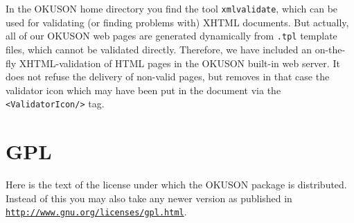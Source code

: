 \documentclass[12pt,openany,a4paper]{book}
\newcommand{\OKUSON}{\textsf{OKUSON}}
\begin{document}
In the {\OKUSON} home directory you find the tool \texttt{xmlvalidate},
which can be used for validating (or finding problems with) XHTML documents.
But actually, all of our {\OKUSON} web pages are generated dynamically from
\texttt{.tpl} template  files, which cannot be validated directly.  Therefore,
we have included an on-the-fly XHTML-validation of HTML pages in the
{\OKUSON} built-in web server. It does not refuse the delivery of non-valid
pages, but removes in that case the validator icon which may have been 
put in the document via the \texttt{<ValidatorIcon/>} tag.

\chapter{GPL}\label{ch:GPL}

Here is the text of the license under which the {\OKUSON} package is
distributed. Instead of this you may also take any newer version as
published in \\
\hspace*{5mm}\href{http://www.gnu.org/licenses/gpl.html}%
{\texttt{http://www.gnu.org/licenses/gpl.html}}.
\end{document}
